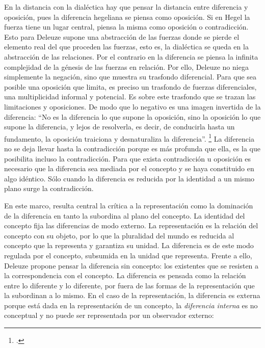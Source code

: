 En la distancia con la dialéctica hay que pensar la distancia entre diferencia y oposición, pues la diferencia hegeliana se piensa como oposición. Si en Hegel la fuerza tiene un lugar central, piensa la misma como oposición o contradicción. Esto para Deleuze supone una abstracción de las fuerzas donde se pierde el elemento real del que proceden las fuerzas, esto es, la dialéctica se queda en la abstracción de las relaciones. Por el contrario en la diferencia se piensa la infinita complejidad de la génesis de las fuerzas en relación. Por ello, Deleuze no niega simplemente la negación, sino que muestra su trasfondo diferencial. Para que sea posible una oposición que limita, es preciso un trasfondo de fuerzas diferenciales, una multiplicidad informal y potencial. Es sobre este trasfondo que se trazan las limitaciones y oposiciones. De modo que lo negativo es una imagen invertida de la diferencia: \enquote{No es la diferencia lo que supone la oposición, sino la oposición lo que supone la diferencia, y lejos de resolverla, es decir, de conducirla hasta un fundamento, la oposición traiciona y desnaturaliza la diferencia}. \footcite[98]{@6961-DELEUZE2002} La diferencia no se deja llevar hasta la contradicción porque es más profunda que ella, es la que posibilita incluso la contradicción. Para que exista contradicción u oposición es necesario que la diferencia sea mediada por el concepto y se haya constituido en algo idéntico. Sólo cuando la diferencia es reducida por la identidad a un mismo plano surge la contradicción.

En este marco, resulta central la crítica a la representación como la dominación de la diferencia en tanto la subordina al plano del concepto. La identidad del concepto fija las diferencias de modo externo. La representación es la relación del concepto con su objeto, por lo que la pluralidad del mundo es reducida al concepto que la representa y garantiza su unidad. La diferencia es de este modo regulada por el concepto, subsumida en la unidad que representa. Frente a ello, Deleuze propone pensar la diferencia sin concepto: los existentes que se resisten a la correspondencia con el concepto. La diferencia es pensada como la relación entre lo diferente y lo diferente, por fuera de las formas de la representación que la subordinan a lo mismo. En el caso de la representación, la diferencia es externa porque está dada en la representación de un concepto, la \emph{diferencia interna} es no conceptual y no puede ser representada por un observador externo:

